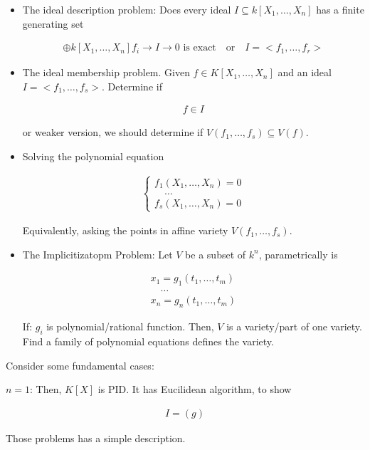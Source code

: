 \documentclass[Total.tex]{subfiles}
\begin{document}
			\begin{itemize}
				\item The ideal description problem: Does every ideal $I\subseteq k[X_1,\dots,X_n]$ has a finite generating set
				
				\begin{gather*}
					\oplus k[X_1,\dots,X_n]f_i\rightarrow I \rightarrow 0\mbox{ is exact}\quad\mbox{or}\quad I=<f_1,\dots,f_r>
				\end{gather*}
				
				\item The ideal membership problem. Given $f\in K[X_1,\dots,X_n]$ and an ideal $I=<f_1,\dots,f_s>$. Determine if 
				
				\begin{gather*}
					f\in I
				\end{gather*}
				
				or weaker version, we should determine if $V(f_1,\dots,f_s)\subseteq V(f)$.
				\item Solving the polynomial equation
				
				\begin{gather*}
					\begin{cases}
						f_1(X_1,\dots,X_n)=0\\
						\quad\dots\\
						f_s(X_1,\dots,X_n)=0
					\end{cases}
				\end{gather*}
					
					Equivalently, asking the points in affine variety $V(f_1,\dots,f_s)$.
					
				\item The Implicitizatopm Problem: Let $V$ be a subset of $k^n$, parametrically is
				
				\begin{gather*}
					x_1=g_1(t_1,\dots,t_m)\\
					\quad\dots\\
					x_n=g_n(t_1,\dots,t_m)
				\end{gather*}
				
				If: $g_i$ is polynomial/rational function. Then, $V$ is a variety/part of one variety. Find a family of polynomial equations defines the variety.
			\end{itemize}
			
			Consider some fundamental cases:
			
			\begin{example}
				$n=1$: Then, $K[X]$ is PID. It has Eucilidean algorithm, to show
				
				\begin{gather*}
					I=(g)
				\end{gather*}
				
				Those problems has a simple description.
			\end{example}
			
\end{document}
